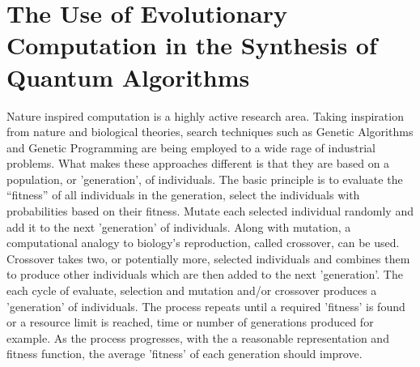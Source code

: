 % 

% 
% 	
% 
%  
% 	
% 	

\section{The Use of Evolutionary Computation in the Synthesis of Quantum Algorithms}
Nature inspired computation is a highly active research area.
Taking inspiration from nature and biological theories, search techniques such as Genetic Algorithms and Genetic Programming are being employed to a wide rage of industrial problems.
What makes these approaches different is that they are based on a population, or 'generation', of individuals.
The basic principle is to evaluate the ``fitness'' of all individuals in the generation, select the individuals with probabilities based on their fitness.
Mutate each selected individual randomly and add it to the next 'generation' of individuals.
Along with mutation, a computational analogy to biology's reproduction, called crossover, can be used.
Crossover takes two, or potentially more, selected individuals and combines them to produce other individuals which are then added to the next 'generation'.
The each cycle of evaluate, selection and mutation and/or crossover produces a 'generation' of individuals.
The process repeats until a required 'fitness' is found or a resource limit is reached, time or number of generations produced for example.
As the process progresses, with the a reasonable representation and fitness function, the average 'fitness' of each generation should improve.

